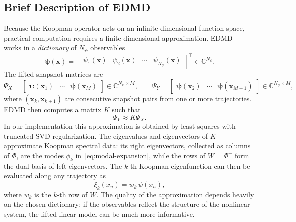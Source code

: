 \documentclass[11pt]{article}
\newcommand{\C}{\mathbb{C}}
\begin{document}
\subsection{Brief Description of EDMD}
Because the Koopman operator acts on an infinite-dimensional function space, practical computation requires a finite-dimensional approximation. EDMD~\cite{williams2015} works in a \emph{dictionary} of $N_\psi$ observables
\begin{equation}
    \boldsymbol{\psi}(\mathbf{x}) =
    \begin{bmatrix} \psi_1(\mathbf{x}) & \psi_2(\mathbf{x}) & \cdots &
    \psi_{N_\psi}(\mathbf{x}) \end{bmatrix}^\top \in \C^{N_\psi}.
    \label{eq:dict}
\end{equation}
The lifted snapshot matrices are
\begin{equation}
    \Psi_X = \begin{bmatrix} \boldsymbol{\psi}(\mathbf{x}_1) & \cdots &
    \boldsymbol{\psi}(\mathbf{x}_M) \end{bmatrix} \in \C^{N_\psi \times M},
    \qquad
    \Psi_Y = \begin{bmatrix} \boldsymbol{\psi}(\mathbf{x}_2) & \cdots &
    \boldsymbol{\psi}(\mathbf{x}_{M+1}) \end{bmatrix} \in \C^{N_\psi \times M},
    \label{eq:snapshots}
\end{equation}
where $(\mathbf{x}_k, \mathbf{x}_{k+1})$ are consecutive snapshot pairs from
one or more trajectories.
EDMD then computes a matrix $K$ such that
\begin{equation}
    \Psi_Y \approx K \Psi_X.
\end{equation}
In our implementation this approximation is obtained by least squares with truncated SVD regularization. The eigenvalues and eigenvectors of $K$ approximate Koopman spectral data: its right eigenvectors, collected as columns of $\Phi$, are the modes $\phi_k$ in~\eqref{eq:modal-expansion}, while the rows of $W = \Phi^{+}$ form the dual basis of left eigenvectors. The $k$-th Koopman eigenfunction can then be evaluated along any trajectory as
\begin{equation}
    \xi_k(x_n) = w_k^\top \psi(x_n),
    \label{eq:eigenfunction-from-data}
\end{equation}
where $w_k$ is the $k$-th row of $W$. The quality of the approximation depends heavily on the chosen dictionary: if the observables reflect the structure of the nonlinear system, the lifted linear model can be much more informative.
\end{document}
